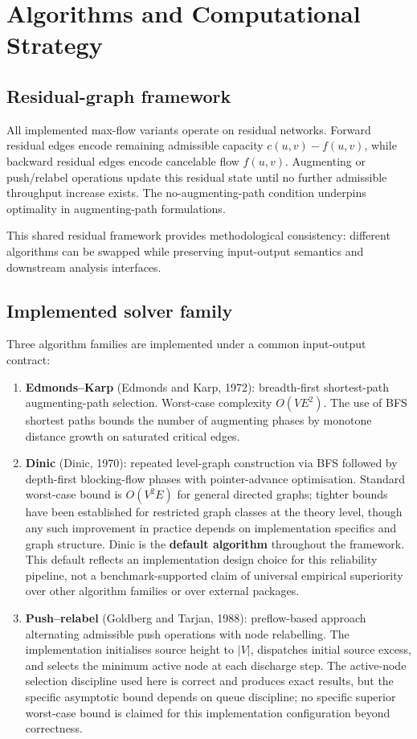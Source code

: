 \documentclass[12pt]{report}
\begin{document}
\section{Algorithms and Computational Strategy}

\subsection{Residual-graph framework}

All implemented max-flow variants operate on residual networks. Forward residual edges encode remaining admissible capacity $c(u,v)-f(u,v)$, while backward residual edges encode cancelable flow $f(u,v)$. Augmenting or push/relabel operations update this residual state until no further admissible throughput increase exists. The no-augmenting-path condition underpins optimality in augmenting-path formulations.

This shared residual framework provides methodological consistency: different algorithms can be swapped while preserving input-output semantics and downstream analysis interfaces.

\subsection{Implemented solver family}

Three algorithm families are implemented under a common input-output contract:

\begin{enumerate}
    \item \textbf{Edmonds--Karp} (Edmonds and Karp, 1972): breadth-first shortest-path augmenting-path selection. Worst-case complexity $O(VE^2)$. The use of BFS shortest paths bounds the number of augmenting phases by monotone distance growth on saturated critical edges.
    \item \textbf{Dinic} (Dinic, 1970): repeated level-graph construction via BFS followed by depth-first blocking-flow phases with pointer-advance optimisation. Standard worst-case bound is $O(V^2E)$ for general directed graphs; tighter bounds have been established for restricted graph classes at the theory level, though any such improvement in practice depends on implementation specifics and graph structure. Dinic is the \textbf{default algorithm} throughout the framework. This default reflects an implementation design choice for this reliability pipeline, not a benchmark-supported claim of universal empirical superiority over other algorithm families or over external packages.
    \item \textbf{Push--relabel} (Goldberg and Tarjan, 1988): preflow-based approach alternating admissible push operations with node relabelling. The implementation initialises source height to $|V|$, dispatches initial source excess, and selects the minimum active node at each discharge step. The active-node selection discipline used here is correct and produces exact results, but the specific asymptotic bound depends on queue discipline; no specific superior worst-case bound is claimed for this implementation configuration beyond correctness.
\end{enumerate}
\end{document}
